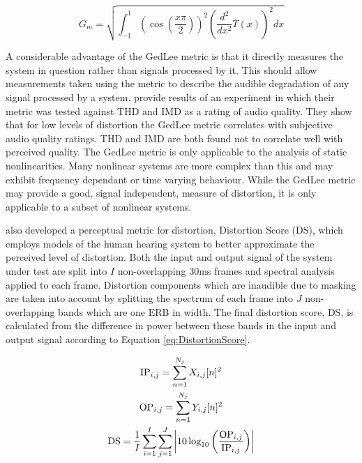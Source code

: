 		\begin{equation}
			G_{m} = \sqrt{\int_{-1}^{1} \left( \cos \left( \frac{x\pi}{2} \right) \right)^{2}
				      \left( \frac{d^{2}}{dx^{2}} T(x) \right)^{2} dx}
			\label{eq:gedlee}
		\end{equation}

		A considerable advantage of the GedLee metric is that it directly measures the system in question rather
		than signals processed by it. This should allow measurements taken using the metric to describe the audible
		degradation of any signal processed by a system. \citet{lee2003auditory} provide results of an experiment in
		which their metric was tested against THD and IMD as a rating of audio quality. They show that for low
		levels of distortion the GedLee metric correlates with subjective audio quality ratings. THD and IMD are
		both found not to correlate well with perceived quality. The GedLee metric is only applicable to the
		analysis of static nonlinearities. Many nonlinear systems are more complex than this and may exhibit
		frequency dependant or time varying behaviour. While the GedLee metric may provide a good, signal
		independent, measure of distortion, it is only applicable to a subset of nonlinear systems.

		\citet{tan2003the} also developed a perceptual metric for distortion, Distortion Score ($\mathrm{DS}$),
		which employs models of the human hearing system to better approximate the perceived level of distortion.
		Both the input and output signal of the system under test are split into $I$ non-overlapping 30ms frames and
		spectral analysis applied to each frame. Distortion components which are inaudible due to masking are taken
		into account by splitting the spectrum of each frame into $J$ non-overlapping bands which are one
		$\mathrm{ERB}$ in width. The final distortion score, $\mathrm{DS}$, is calculated from the difference in
		power between these bands in the input and output signal according to Equation \ref{eq:DistortionScore}.

		\begin{gather}
			\mathrm{IP}_{i,j} = \sum_{n = 1}^{N_{j}} X_{i,j}[n]^2 \nonumber \\
			\mathrm{OP}_{i,j} = \sum_{n = 1}^{N_{j}} Y_{i,j}[n]^2 \nonumber \\
			\mathrm{DS} = \frac{1}{I} \sum_{i = 1}^{I} \sum_{j = 1}^{J} 
				\left|10\log_{10} \left( \frac{\mathrm{OP}_{i,j}}{\mathrm{IP}_{i,j}} \right) \right|
			\label{eq:DistortionScore}
		\end{gather}

